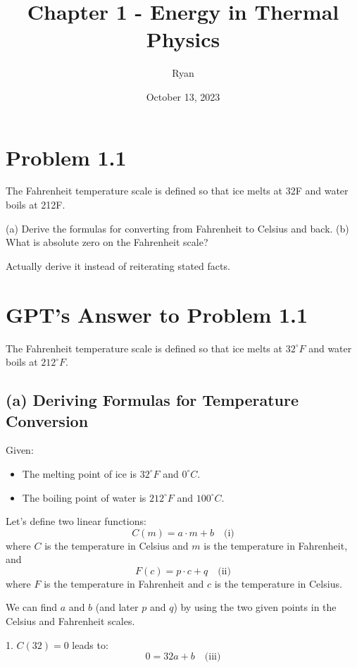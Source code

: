 \documentclass[12pt]{article}
\title{Chapter 1 - Energy in Thermal Physics}
\date{October 13, 2023}
\author{Ryan}
\begin{document}
\maketitle
\section*{Problem 1.1}

The Fahrenheit temperature scale is defined so that ice melts at
32F and water boils at 212F.

(a) Derive the formulas for converting from Fahrenheit to Celsius and back.
(b) What is absolute zero on the Fahrenheit scale?

Actually derive it instead of reiterating stated facts.

\section*{GPT's Answer to Problem 1.1}

The Fahrenheit temperature scale is defined so that ice melts at \(32^\circ F\) and water boils at \(212^\circ F\).

\subsection*{(a) Deriving Formulas for Temperature Conversion}

Given: 
\begin{itemize}
    \item The melting point of ice is \(32^\circ F\) and \(0^\circ C\).
    \item The boiling point of water is \(212^\circ F\) and \(100^\circ C\).
\end{itemize}

Let's define two linear functions:
\begin{equation}
    C(m) = a \cdot m + b \quad \text{(i)}
\end{equation}
where \(C\) is the temperature in Celsius and \(m\) is the temperature in Fahrenheit, and
\begin{equation}
    F(c) = p \cdot c + q \quad \text{(ii)}
\end{equation}
where \(F\) is the temperature in Fahrenheit and \(c\) is the temperature in Celsius.

We can find \(a\) and \(b\) (and later \(p\) and \(q\)) by using the two given points in the Celsius and Fahrenheit scales.

1. \(C(32) = 0\) leads to:
\begin{equation}
    0 = 32a + b \quad \text{(iii)}
\end{equation}
\end{document}
